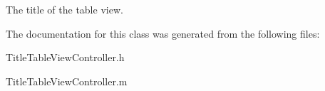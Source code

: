 \-The title of the table view. 

\-The documentation for this class was generated from the following files\-:\begin{DoxyCompactItemize}
\item 
\-Title\-Table\-View\-Controller.\-h\item 
\-Title\-Table\-View\-Controller.\-m\end{DoxyCompactItemize}
